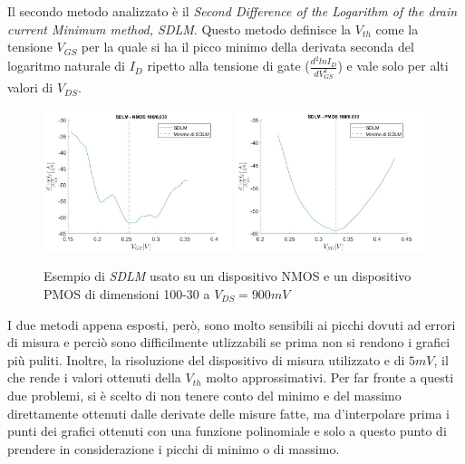 \documentclass[12pt, letterpaper]{book}
\begin{document}
Il secondo metodo analizzato è il \emph{Second Difference of the Logarithm of the drain current Minimum method, SDLM}. Questo metodo definisce la $V_{th}$ come la tensione $V_{GS}$ per la quale si ha il picco minimo della derivata seconda del logaritmo naturale di $I_D$ ripetto alla tensione di gate ($\frac{d^2lnI_D}{dV_{GS}^2}$) e vale solo per alti valori di $V_{DS}$. \\

\begin{figure}[H]
  \centering
  \includegraphics[width=0.49\textwidth]{SDLM-N4-100-30-NoFit}
  \includegraphics[width=0.49\textwidth]{SDLM-P1-100-30-NoFit}
  \caption{Esempio di \emph{SDLM} usato su un dispositivo NMOS e un dispositivo PMOS di dimensioni 100-30 a $V_{DS} = 900 mV$}
\end{figure}


I due metodi appena esposti, però, sono molto sensibili ai picchi dovuti ad errori di misura e perciò sono difficilmente utlizzabili se prima non si rendono i grafici più puliti. Inoltre, la risoluzione del dispositivo di misura utilizzato e di $5 mV$, il che rende i valori ottenuti della $V_{th}$ molto approssimativi.
Per far fronte a questi due problemi, si è scelto di non tenere conto del minimo e del massimo direttamente ottenuti dalle derivate delle misure fatte, ma d'interpolare prima i punti dei grafici ottenuti con una funzione polinomiale e solo a questo punto di prendere in considerazione i picchi di minimo o di massimo. \\
\end{document}
